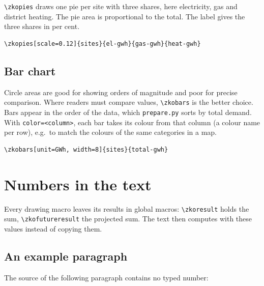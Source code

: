 \documentclass[11pt,a4paper]{article}
\begin{document}
\verb|\zkopies| draws one pie per site with three shares, here electricity,
gas and district heating. The pie area is proportional to the total. The label
gives the three shares in per cent.

\begin{Verbatim}
\zkopies[scale=0.12]{sites}{el-gwh}{gas-gwh}{heat-gwh}
\end{Verbatim}

\begin{center}
\end{center}

\subsection{Bar chart}

Circle areas are good for showing orders of magnitude and poor for precise
comparison. Where readers must compare values, \verb|\zkobars| is the better
choice. Bars appear in the order of the data, which \texttt{prepare.py} sorts
by total demand. With \texttt{color=<column>}, each bar takes its colour
from that column (a colour name per row), e.g.\ to match the colours of the same
categories in a map.

\begin{Verbatim}
\zkobars[unit=GWh, width=8]{sites}{total-gwh}
\end{Verbatim}

\begin{center}
\end{center}

\section{Numbers in the text}\label{sec:numbers}

Every drawing macro leaves its results in global macros: \verb|\zkoresult|
holds the sum, \verb|\zkofutureresult| the projected sum. The text then
computes with these values instead of copying them.

\subsection{An example paragraph}

%
%
The source of the following paragraph contains no typed number:
\end{document}
